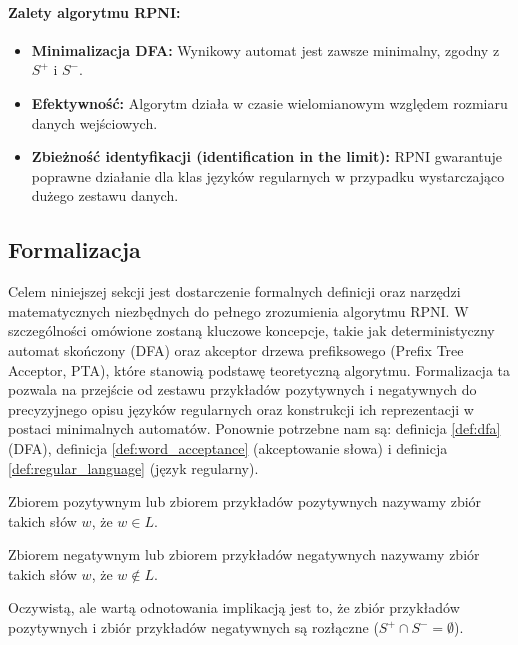 \paragraph*{Zalety algorytmu RPNI:}
\begin{itemize}
    \item \textbf{Minimalizacja DFA:} Wynikowy automat jest zawsze minimalny, zgodny z \( S^+ \) i \( S^- \).
    \item \textbf{Efektywność:} Algorytm działa w czasie wielomianowym względem rozmiaru danych wejściowych.
    \item \textbf{Zbieżność identyfikacji (identification in the limit):} RPNI gwarantuje poprawne działanie dla klas języków regularnych w przypadku wystarczająco dużego zestawu danych.
\end{itemize}

\subsection{Formalizacja}

Celem niniejszej sekcji jest dostarczenie formalnych definicji oraz narzędzi matematycznych niezbędnych do pełnego zrozumienia algorytmu RPNI. W szczególności omówione zostaną kluczowe koncepcje, takie jak deterministyczny automat skończony (DFA) oraz akceptor drzewa prefiksowego (Prefix Tree Acceptor, PTA), które stanowią podstawę teoretyczną algorytmu. Formalizacja ta pozwala na przejście od zestawu przykładów pozytywnych i negatywnych do precyzyjnego opisu języków regularnych oraz konstrukcji ich reprezentacji w postaci minimalnych automatów. Ponownie potrzebne nam są: definicja \ref{def:dfa} (DFA), definicja \ref{def:word_acceptance} (akceptowanie słowa) i definicja \ref{def:regular_language} (język regularny).

\begin{definition}
    Zbiorem pozytywnym lub zbiorem przykładów pozytywnych nazywamy zbiór takich słów $w$, że \( w \in L \).
\end{definition}

\begin{definition}
    Zbiorem negatywnym lub zbiorem przykładów negatywnych nazywamy zbiór takich słów $w$, że \( w \notin L \).
\end{definition}

Oczywistą, ale wartą odnotowania implikacją jest to, że zbiór przykładów pozytywnych i zbiór przykładów negatywnych są rozłączne (\( S^+ \cap S^- = \emptyset \)).

